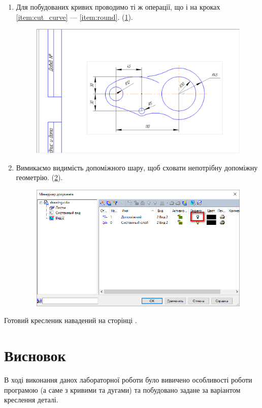 \begin{enumerate}[leftmargin=*]
\item Для побудованих кривих проводимо ті ж операції, що і на кроках \ref{item:cut_curve} ---
  \ref{item:round}.  (\ref{fig:lab4:step10}).
  \begin{figure}[!ht]
    \centering \includegraphics[width=0.9\linewidth]{./images/lab4/step10.png}
    \caption{\label{fig:lab4:step10}}
  \end{figure}
  \FloatBarrier

\item Вимикаємо видимість допоміжного шару, щоб сховати непотрібну допоміжну
  геометрію. (\ref{fig:lab4:step11}).
  \begin{figure}[!ht]
    \centering \includegraphics[width=0.9\linewidth]{./images/lab4/step11.png}
    \caption{\label{fig:lab4:step11}}
  \end{figure}
  \FloatBarrier
  
\end{enumerate}

Готовий кресленик навадений на сторінці \pageref{lab4:pdf:drawing}.
\newpage
\NoBorder
\label{lab4:pdf:drawing}
 \BorderText

\newpage
\section*{Висновок}

В ході виконання данох лабораторної роботи було вивичено особливості роботи програмою (а саме з
кривими та дугами) та побудовано задане за варіантом креслення деталі.
